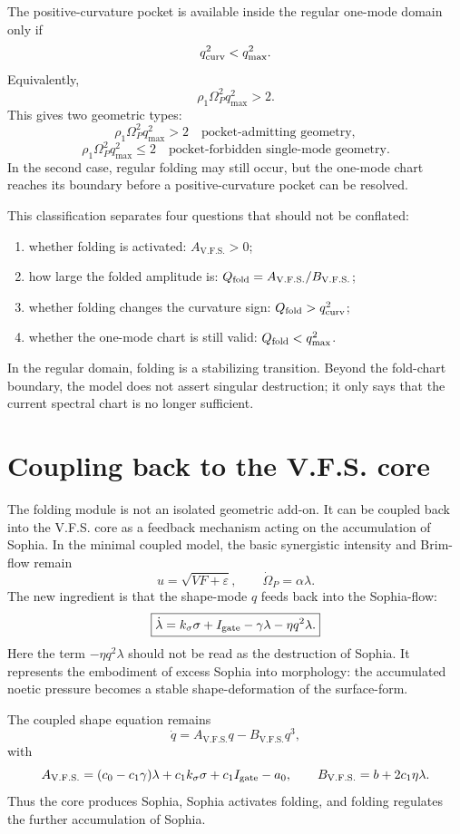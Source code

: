 \documentclass[11pt,a4paper]{article}
\newcommand{\VFS}{\ensuremath{\mathrm{V.F.S.}}}
\newcommand{\Op}{\Omega_P}
\newcommand{\Igate}{I_{\rm gate}}
\theoremstyle{plain}
\theoremstyle{remark}
\theoremstyle{definition}
\begin{document}
The positive-curvature pocket is available inside the regular one-mode domain only if
\[
q_{\rm curv}^2<q_{\max}^2.
\]
Equivalently,
\[
\boxed{
\rho_1\Op^2q_{\max}^2>2.
}
\]
This gives two geometric types:
\[
\boxed{
\rho_1\Op^2q_{\max}^2>2
\quad\text{pocket-admitting geometry},
}
\]
\[
\boxed{
\rho_1\Op^2q_{\max}^2\le2
\quad\text{pocket-forbidden single-mode geometry}.
}
\]
In the second case, regular folding may still occur, but the one-mode chart reaches its boundary
before a positive-curvature pocket can be resolved.

This classification separates four questions that should not be conflated:
\begin{enumerate}[label=(\roman*)]
\item whether folding is activated: $A_{\VFS}>0$;
\item how large the folded amplitude is: $Q_{\rm fold}=A_{\VFS}/B_{\VFS}$;
\item whether folding changes the curvature sign: $Q_{\rm fold}>q_{\rm curv}^2$;
\item whether the one-mode chart is still valid: $Q_{\rm fold}<q_{\max}^2$.
\end{enumerate}
In the regular domain, folding is a stabilizing transition. Beyond the fold-chart boundary, the
model does not assert singular destruction; it only says that the current spectral chart is no longer
sufficient.


\section{Coupling back to the V.F.S. core}
The folding module is not an isolated geometric add-on. It can be coupled back into the V.F.S.
core as a feedback mechanism acting on the accumulation of Sophia. In the minimal coupled model,
the basic synergistic intensity and Brim-flow remain
\[
u=\sqrt{VF+\varepsilon},
\qquad
\dot\Op=\alpha\lambda.
\]
The new ingredient is that the shape-mode $q$ feeds back into the Sophia-flow:
\[
\boxed{
\dot\lambda
=
k_\sigma\sigma+
\Igate
-\gamma\lambda
-\eta q^2\lambda.
}
\]
Here the term $-\eta q^2\lambda$ should not be read as the destruction of Sophia. It represents the
embodiment of excess Sophia into morphology: the accumulated noetic pressure becomes a stable
shape-deformation of the surface-form.

The coupled shape equation remains
\[
\boxed{
\dot q=A_{\VFS}q-B_{\VFS}q^3,
}
\]
with
\[
A_{\VFS}
=
(c_0-c_1\gamma)\lambda+c_1k_\sigma\sigma+c_1\Igate-a_0,
\qquad
B_{\VFS}=b+2c_1\eta\lambda.
\]
Thus the core produces Sophia, Sophia activates folding, and folding regulates the further
accumulation of Sophia.
\end{document}
